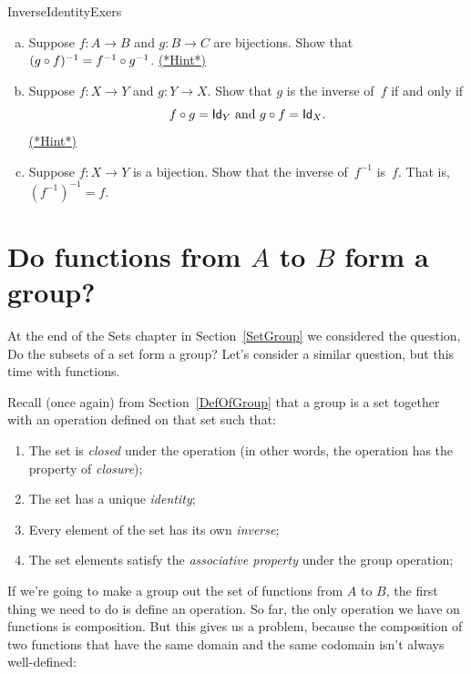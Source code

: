 \begin{exercise}{InverseIdentityExers}\ 
\begin{enumerate}[(a)]
\item \label{InverseIdentityExers-InvOfComp}
Suppose $f \colon A \to B$ and $g \colon B \to C$ are bijections. Show that $(g \circ f)^{-1} = f^{-1} \circ g^{-1}$.
\hyperref[sec:functions:hints]{(*Hint*)}
\item \label{InverseIdentityExers-Comp=Id}
Suppose $f \colon X \to Y$ and $g \colon Y \to X$. Show that $g$ is the inverse of~$f$ if and only if
\[ f \circ g = {\sf Id}_Y \text{  and  }g \circ f = {\sf Id}_X .\]
\hyperref[sec:functions:hints]{(*Hint*)}
\item \label{InverseIdentityExers-InvOfInv}
Suppose $f \colon X \to Y$ is a bijection. Show that the inverse of~$f^{-1}$ is~$f$. That is, $(f^{-1})^{-1} = f$.
\end{enumerate}
\end{exercise}

\section{Do functions from $A$ to $B$ form a group?} \label{functions_group}

At the end of the Sets chapter in Section~\ref{SetGroup} we considered the question, Do the subsets of a set form a group? Let's consider a similar question, but this time with functions. 

Recall (once again) from Section~\ref{DefOfGroup} that a group is a set together with an operation defined on that set such that:  
\begin{enumerate}
\item
The set is \emph{closed} under the operation (in other words, the operation has the property of \emph{closure});
\item
The set has  a unique \emph{identity};
\item
Every element of the set has its own \emph{inverse};
\item
The set elements satisfy the \emph{associative property} under the group operation;
\end{enumerate}

If we're going to make a group out the set of functions from $A$ to $B$, the first thing we need to do is define an operation. So far, the only operation we have on functions is composition. But this gives us a problem, because the composition of two functions that have the same domain and the same codomain  isn't always well-defined: 


